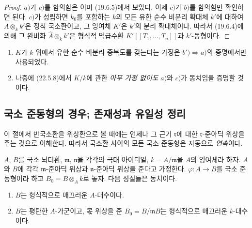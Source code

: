 \begin{proof}
$a)$가 $c)$를 함의함은 이미 (19.6.5)에서 보았다. 이제 $c)$가 $b)$를
함의함만 확인하면 된다. $c)$가 성립하면 $k_0$를 포함하는 $k$의 모든
유한 순수 비분리 확대체 $k'$에 대하여 $A\otimes_k k'$은 정칙
국소환이고, 그 잉여체 $K'$은 $k'$의 분리 확대체이다. 따라서
(19.6.4)에 의해 그 완비화 $\widehat A\otimes_k k'$은 형식적
멱급수환 $K'[[T_1,\ldots,T_n]]$과 $k'$-동형이다.
\end{proof}

\begin{remarks}[19.6.7]
\label{0.19.6.7-ko}
\begin{enumerate}
  \item[\rm(i)] $K$가 $k$ 위에서 유한 순수 비분리 중복도를 갖는다는
  가정은 $b')\Rightarrow a)$의 증명에서만 사용되었다.
  \item[\rm(ii)] 나중에 (22.5.8)에서 $K/k$에 관한 \emph{아무 가정
  없이도} $a)$와 $c)$가 동치임을 증명할 것이다.
\end{enumerate}
\end{remarks}

\subsection{국소 준동형의 경우; 존재성과 유일성 정리}
\label{subsection:0.19.7-ko}

이 절에서 반국소환을 위상환으로 볼 때에는 언제나 그 근기
$\mathfrak r$에 대한 $\mathfrak r$-준아딕 위상을 주는 것으로 이해한다.
따라서 국소환 사이의 모든 국소 준동형은 자동으로 \emph{연속}이다.

\begin{theorem}[19.7.1]
\label{0.19.7.1-ko}
$A$, $B$를 국소 뇌터환, $\mathfrak m$, $\mathfrak n$을 각각의 극대
아이디얼, $k=A/\mathfrak m$을 $A$의 잉여체라 하자. $A$와 $B$에 각각
$\mathfrak m$-준아딕 위상과 $\mathfrak n$-준아딕 위상을 준다고
가정한다. $\varphi:A\to B$를 국소 준동형이라 하고
$B_0=B\otimes_A k$로 놓자. 다음 성질들은 동치이다.
\begin{enumerate}
  \item[a)] $B$는 형식적으로 매끄러운 $A$-대수이다.


  \item[b)] $B$는 평탄한 $A$-가군이고, 몫 위상을 준
  $B_0=B/\mathfrak mB$는 형식적으로 매끄러운 $k$-대수이다.
\end{enumerate}
\end{theorem}

